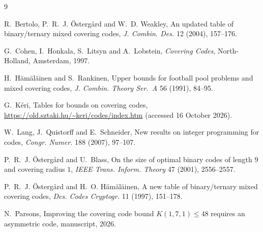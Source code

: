 \documentclass[11pt]{article}
\theoremstyle{remark}
\begin{document}
\begin{thebibliography}{9}

 R.~Bertolo, P.~R.~J. Östergård and W.~D. Weakley, An updated table of
binary/ternary mixed covering codes, \emph{J. Combin. Des.} 12 (2004), 157--176.

 G.~Cohen, I.~Honkala, S.~Litsyn and A.~Lobstein, \emph{Covering Codes},
North-Holland, Amsterdam, 1997.

 H.~Hämäläinen and S.~Rankinen, Upper bounds for football pool problems and mixed
covering codes, \emph{J. Combin. Theory Ser.~A} 56 (1991), 84--95.

 G.~Kéri, Tables for bounds on covering codes,
\url{https://old.sztaki.hu/~keri/codes/index.htm} (accessed 16 October 2026).

 W.~Lang, J.~Quistorff and E.~Schneider, New results on integer programming for
codes, \emph{Congr. Numer.} 188 (2007), 97--107.

 P.~R.~J. Östergård and U.~Blass, On the size of optimal binary codes of length $9$
and covering radius $1$, \emph{IEEE Trans. Inform. Theory} 47 (2001), 2556--2557.

 P.~R.~J. Östergård and H.~O. Hämäläinen, A new table of binary/ternary mixed
covering codes, \emph{Des. Codes Cryptogr.} 11 (1997), 151--178.

 N.~Parsons, Improving the covering code bound $K(1,7,1)\le 48$ requires an
asymmetric code, manuscript, 2026.

\end{thebibliography}
\end{document}
